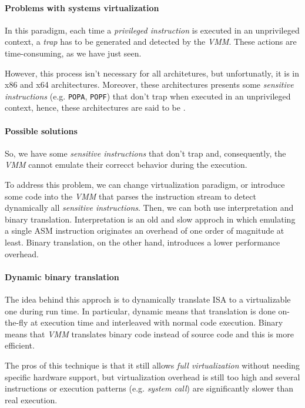 \paragraph{Problems with systems virtualization}
In this paradigm, each time a \emph{privileged instruction} is executed in an
unprivileged context, a \emph{trap} has to be generated and detected by the
\emph{VMM}. These actions are time-consuming, as we have just seen.

However, this process isn't necessary for all architetures, but unfortunatly,
it is in x86 and x64 architectures. Moreover, these architectures presents
some \emph{sensitive instructions} (e.g. \texttt{POPA}, \texttt{POPF}) that
don't trap when executed in an unprivileged context, hence, these architectures
are said to be .

\paragraph{Possible solutions}
So, we have some \emph{sensitive instructions} that don't trap and,
consequently, the \emph{VMM} cannot emulate their correcct behavior during the
execution.

To address this problem, we can change virtualization paradigm, or introduce
some code into the \emph{VMM} that parses the instruction stream to detect
dynamically all \emph{sensitive instructions}. Then, we can both use
interpretation and binary translation. Interpretation is an old and slow approch
in which emulating a single ASM instruction originates an overhead of one order
of magnitude at least. Binary translation, on the other hand, introduces a
lower performance overhead.

\paragraph{Dynamic binary translation}
The idea behind this approch is to dynamically translate 
ISA to a virtualizable one during run time. In particular, dynamic means that
translation is done on-the-fly at execution time and interleaved with normal
code execution. Binary means that \emph{VMM} translates binary code instead of
source code and this is more efficient.

The pros of this technique is that it still allows \emph{full virtualization}
without needing specific hardware support, but virtualization overhead is still
too high and several instructions or execution patterns (e.g. \emph{system call})
are significantly slower than real execution.

